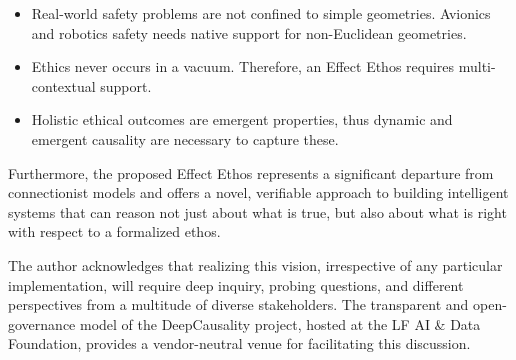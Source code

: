 \begin{itemize}
    \item Real-world safety problems are not confined to simple geometries. Avionics and robotics safety needs native support
  for non-Euclidean geometries.
    \item Ethics never occurs in a vacuum. Therefore, an Effect Ethos requires multi-contextual support.
    \item Holistic ethical outcomes are emergent properties, thus dynamic and emergent causality are necessary to capture these.
\end{itemize}

Furthermore, the proposed Effect Ethos represents a significant departure from connectionist models and offers a novel,
verifiable approach to building intelligent systems that can reason not just about what is true, but also about what is
right with respect to a formalized ethos.

The author acknowledges that realizing this vision, irrespective of any particular implementation, will require deep
inquiry, probing questions, and different perspectives from a multitude of diverse stakeholders. The transparent and
open-governance model of the DeepCausality project, hosted at the LF AI \& Data Foundation, provides a vendor-neutral
venue for facilitating this discussion.

\newpage